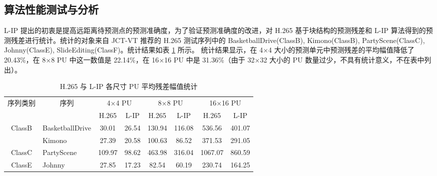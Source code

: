 \subsection{算法性能测试与分析}
\label{cha:L-IPTest}
L-IP 提出的初衷是提高远距离待预测点的预测准确度，为了验证预测准确度的改进，对 H.265 基于块结构的预测残差和 L-IP 算法得到的预测残差进行统计。统计的对象来自 JCT-VT 推荐的 H.265 测试序列中的 BasketballDrive(ClassB), Kimono(ClassB), PartyScene(ClassC), Johnny(ClassE), SlideEditing(ClassF)。统计结果如表 \ref{tab:L-IPResidualReduction} 所示。
统计结果显示，在 4$\times$4 大小的预测单元中预测残差的平均幅值降低了 20.43\%，在 8$\times$8 PU 中这一数值是 22.14\%，在 16$\times$16 PU 中是 31.36\%（由于 32$\times$32 大小的 PU 数量过少，不具有统计意义，不在表中列出）。
\begin{table}[hbt]
    \centering
    \caption{H.265 与 L-IP 各尺寸 PU 平均残差幅值统计}
    \label{tab:L-IPResidualReduction}
    \begin{tabular}{@{}clcccccc@{}}
        \toprule
        \multirow{2}{*}{序列类别}                & \multicolumn{1}{c}{\multirow{2}{*}{序列}} & \multicolumn{2}{c}{4$\times$4 PU} & \multicolumn{2}{c}{8$\times$8 PU} & \multicolumn{2}{c}{16$\times$16 PU}                             \\ \cmidrule(l){3-8}
                                                 & \multicolumn{1}{c}{}                      & H.265                             & L-IP                              & H.265                               & L-IP   & H.265   & L-IP   \\ \midrule
        \multirow{2}{*}{ClassB}                  & BasketballDrive                           & 30.01                             & 26.54                             & 130.94                              & 116.08 & 536.56  & 401.07 \\
                                                 & Kimono                                    & 27.39                             & 20.58                             & 100.63                              & 86.52  & 371.53  & 291.05 \\
        ClassC                                   & PartyScene                                & 109.97                            & 98.62                             & 463.98                              & 316.04 & 1067.07 & 860.59 \\
        ClassE                                   & Johnny                                    & 27.85                             & 17.23                             & 82.54                               & 60.19  & 230.74  & 164.25 \\

\end{tabular}
\end{table}
